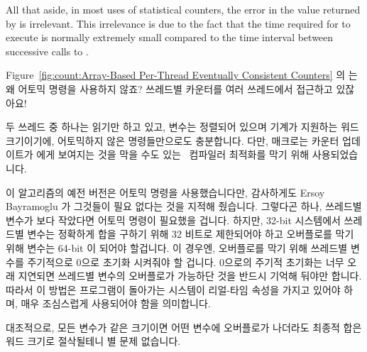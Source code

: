 \begin{enumerate}
	All that aside, in most uses of statistical counters, the
	error in the value returned by  is
	irrelevant.
	This irrelevance is due to the fact that the time required
	for  to execute is normally extremely
	small compared to the time interval between successive
	calls to .
	\fi

\QuickQ{}
	Figure~\ref{fig:count:Array-Based Per-Thread Eventually Consistent
	Counters} 의  는 왜 어토믹 명령을 사용하지 않죠?
	쓰레드별 카운터를 여러 쓰레드에서 접근하고 있잖아요!

\QuickA{}
	두 쓰레드 중 하나는 읽기만 하고 있고, 변수는 정렬되어 있으며 기계가
	지원하는 워드 크기이기에, 어토믹하지 않은 명령들만으로도
	충분합니다.
	다만,  매크로는 카운터 업데이트가 
	에게 보여지는 것을 막을 수도 있는~\cite{JonCorbet2012ACCESS:ONCE}
	컴파일러 최적화를 막기 위해 사용되었습니다.

	이 알고리즘의 예전 버전은 어토믹 명령을 사용했습니다만, 감사하게도
	Ersoy Bayramoglu 가 그것들이 필요 없다는 것을 지적해 줬습니다.
	그렇다곤 하나, 쓰레드별  변수가  보다
	작았다면 어토믹 명령이 필요했을 겁니다.
	하지만, 32-bit 시스템에서 쓰레드별  변수는 정확하게 합을
	구하기 위해 32 비트로 제한되어야 하고 오버플로를 막기 위해
	 변수는 64-bit 이 되어야 할겁니다.
	이 경우엔, 오버플로를 막기 위해 쓰레드별  변수를 주기적으로
	0으로 초기화 시켜줘야 할 겁니다.
	0으로의 주기적 초기화는 너무 오래 지연되면 쓰레드별 변수의 오버플로가
	가능하단 것을 반드시 기억해 둬야만 합니다.
	따라서 이 방법은 프로그램이 돌아가는 시스템이 리얼-타임 속성을 가지고
	있어야 하며, 매우 조심스럽게 사용되어야 함을 의미합니다.

	대조적으로, 모든 변수가 같은 크기이면 어떤 변수에 오버플로가 나더라도
	최종적 합은 워드 크기로 절삭될테니 별 문제 없습니다.
	\iffalse


\end{enumerate}
